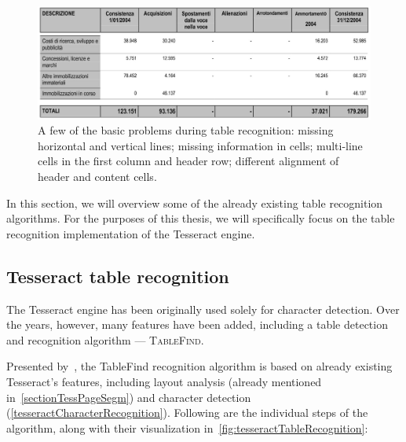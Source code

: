 \begin{figure}[t]
\centering
\includegraphics[width=0.7\linewidth]{img/tableDetection/recognitionProblematic.jpg}
\caption{A few of the basic problems during table recognition: missing horizontal and vertical lines; missing information in cells; multi-line cells in the first column and header row; different alignment of header and content cells.}
\label{fig:tableRecognitionObstacles}
\end{figure}

In this section, we will overview some of the already existing table recognition algorithms. For the purposes of this thesis, we will specifically focus on the table recognition implementation of the Tesseract engine.

\subsection{Tesseract table recognition} \label{tableFind}

The Tesseract engine has been originally used solely for character detection. Over the years, however, many features have been added, including a table detection and recognition algorithm --- \textsc{TableFind}.

Presented by~\citet{tableDetHeterogeneous}, the TableFind recognition algorithm is based on already existing Tesseract's features, including layout analysis (already mentioned in~\cref{sectionTessPageSegm}) and character detection (\cref{tesseractCharacterRecognition}). Following are the individual steps of the algorithm, along with their visualization in~\cref{fig:tesseractTableRecognition}: 

